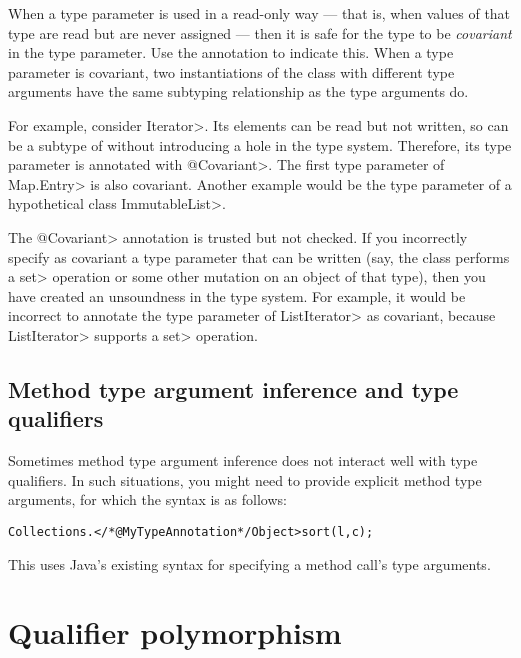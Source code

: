 When a type parameter is used in a read-only way --- that is, when values
of that type are read but are never assigned --- then it is safe for the
type to be \emph{covariant} in the type parameter.  Use the  annotation to indicate
this.
When a type parameter is covariant, two instantiations of the class with
different type arguments have the same subtyping relationship as the type
arguments do.

For example, consider \<Iterator>.  Its elements can be read but not
written, so  can be a subtype of
 without introducing a hole in the type system.
Therefore, its type parameter is annotated with \<@Covariant>.
The first type parameter of \<Map.Entry> is also covariant.
Another example would be the type parameter of a hypothetical class
\<ImmutableList>.

The \<@Covariant> annotation is trusted but not checked.
If you incorrectly specify as covariant a type parameter that can be
written (say, the class performs a
\<set> operation or some other mutation on an object of that type), then
you have created an unsoundness in the type system.
For example, it would be incorrect to annotate the type parameter of
\<ListIterator> as covariant, because \<ListIterator> supports a \<set>
operation.


\subsection{Method type argument inference and type qualifiers\label{infer-method-type-qualifiers}}

Sometimes method type argument inference does not interact well with
type qualifiers. In such situations, you might need to provide
explicit method type arguments, for which the syntax is as follows:

\begin{alltt}
    Collections.</*@MyTypeAnnotation*/ Object>sort(l, c);
\end{alltt}

\noindent
This uses Java's existing syntax for specifying a method call's type arguments.



\section{Qualifier polymorphism\label{qualifier-polymorphism}}

